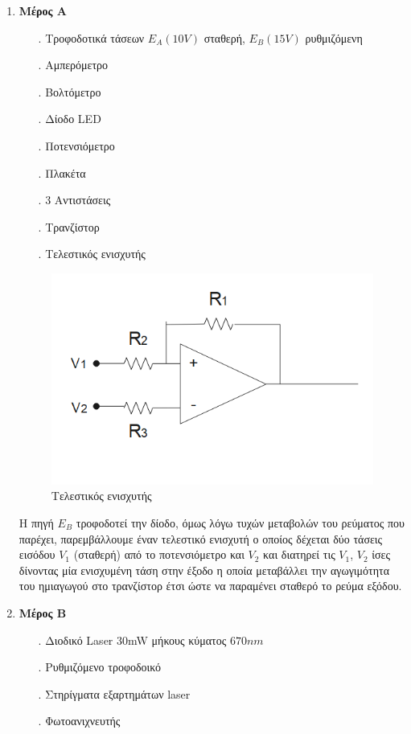 \documentclass[a4paper]{article}
\begin{document}
		\begin{enumerate}
			\item \textbf{Μέρος Α}
				\begin{itemize}
					\item[.] Τροφοδοτικά τάσεων $E_A (10V)$ σταθερή, $E_B(15V)$  ρυθμιζόμενη
					\item[.] Αμπερόμετρο
					\item[.] Βολτόμετρο
					\item[.] Δίοδο LED
					\item[.] Ποτενσιόμετρο
					\item[.] Πλακέτα
					\item[.] 3 Αντιστάσεις 
					\item[.] Τρανζίστορ 
					\item[.] Τελεστικός ενισχυτής
				\end{itemize}
				\begin{figure}[h!]
					\centering
					\includegraphics[scale=0.4]{oper.png}
					\caption{Τελεστικός ενισχυτής }
					\label{im1}
				\end{figure}
		
				Η πηγή $E_B$ τροφοδοτεί την δίοδο, όμως λόγω τυχών μεταβολών του ρεύματος που παρέχει, παρεμβάλλουμε έναν τελεστικό ενισχυτή ο οποίος δέχεται δύο τάσεις εισόδου $V_1$ (σταθερή) από το ποτενσιόμετρο και $V_2$ και διατηρεί τις $V_1$, $V_2$ ίσες δίνοντας μία ενισχυμένη τάση στην έξοδο η οποία μεταβάλλει την αγωγιμότητα του ημιαγωγού στο τρανζίστορ έτσι ώστε να παραμένει σταθερό το ρεύμα εξόδου.				
				
		
			\item \textbf{Μέρος Β}
				\begin{itemize}
					\item[.] Διοδικό Laser 30mW μήκους κύματος $670nm$
					\item[.] Ρυθμιζόμενο τροφοδοικό 
					\item[.] Στηρίγματα εξαρτημάτων laser 
					\item[.] Φωτοανιχνευτής   
				\end{itemize}
		

\end{enumerate}
\end{document}
